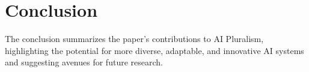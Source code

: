 \section{Conclusion}
The conclusion summarizes the paper's contributions to AI Pluralism, highlighting the potential for more diverse, adaptable, and innovative AI systems and suggesting avenues for future research.
